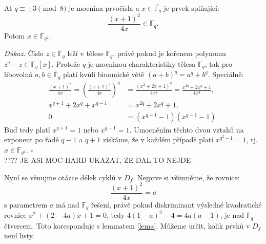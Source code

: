 \documentclass[12pt]{report}
\begin{document}
\begin{veta}
Ať $q \equiv \pm 3 \pmod{8}$ je mocnina prvočísla a $x \in \overline{\mathbb{F}_q}$ je prvek splňující:
$$\frac{(x+1)^2}{4x} \in \mathbb{F}_q.$$
Potom $x \in \mathbb{F}_{q^2}$.
\end{veta}
\noindent \textit{Důkaz.} Číslo $z \in \overline{\mathbb{F}}_q$ leží v tělese $\mathbb{F}_q$, právě pokud je kořenem polynomu $z^q - z \in \mathbb{F}_q [x]$. Protože $q$ je mocninou charakteristiky tělesa $\mathbb{F}_q$, tak pro libovolná $a,b \in \overline{\mathbb{F}}_q$ platí kvůli binomické větě $(a+b)^q = a^q + b^q$. Speciálně:
\begin{align*}
\frac{(x+1)^2}{4x} = \left( \frac{(x+1)^{2}}{4 x} \right)^{q} &= \frac{(x^2+2x+1)^{q}}{4 x^q} = \frac{x^{2q}+2 x^q + 1}{4 x^q},\\
x^{q+1} + 2 x^{q} + x^{q-1} &= x^{2q} + 2x^q + 1,\\
0 &= (x^{q+1} - 1)(x^{q-1} - 1).
\end{align*}
Buď tedy platí $x^{q+1} = 1$ nebo $x^{q-1}=1$. Umocněním těchto dvou vztahů na exponent po řadě $q-1$ a $q+1$ získáme, že v každém případě platí $x^{q^2-1}=1$, tj. $x \in \mathbb{F}_{q^2}$. \hfill $\square$\\

???? JE ASI MOC HARD UKAZAT, ZE DAL TO NEJDE

Nyní se věnujme otázce délek cyklů v $D_f$. Nejprve si všimněme, že rovnice: $$\frac{(x+1)^2}{4x} = a$$ s parametrem $a$ má nad $\mathbb{F}_q$ řešení, právě pokud diskriminant výsledné kvadratické rovnice $x^2 + (2-4a)x+1=0$, tedy $4(1-a)^2-4 = 4a(a-1)$, je nad $\mathbb{F}_q$ čtvercem. Toto koresponduje s lemmatem \ref{lema}. Můžeme určit, kolik prvků v $D_f$ není listy.




\end{document}
